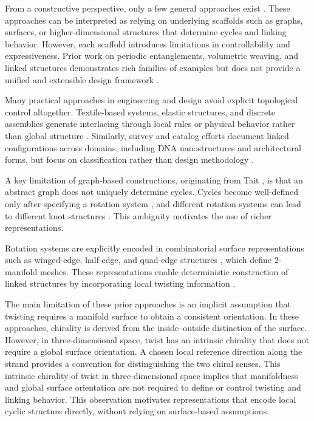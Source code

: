 \documentclass[acmtog]{acmart}
\begin{document}
From a constructive perspective, only a few general approaches exist \citep{tait1877knots,akleman2015extended,akleman2020topologically,akleman2015blockmeshes}. These approaches can be interpreted as relying on underlying scaffolds such as graphs, surfaces, or higher-dimensional structures that determine cycles and linking behavior. However, each scaffold introduces limitations in controllability and expressiveness. Prior work on periodic entanglements, volumetric weaving, and linked structures demonstrates rich families of examples but does not provide a unified and extensible design framework \citep{evans2013periodiceentanglement1,evans2013periodiceentanglement2,yildiz2025woven,yildiz2025linked}.

Many practical approaches in engineering and design avoid explicit topological control altogether. Textile-based systems, elastic structures, and discrete assemblies generate interlacing through local rules or physical behavior rather than global structure \citep{borhani2016material,borhani2016emergence,kozlov2013structures,liu2025doublelayeredegridshells,ren2021curvedribbons,verhoeff2011chainlinkfence,roelofs2007rings,yang2025topologicalwovennodes}. Similarly, survey and catalog efforts document linked configurations across domains, including DNA nanostructures and architectural forms, but focus on classification rather than design methodology \citep{glaser2021dnananostructures,kozlov2018knots,gailiunas2022tplinks}.

A key limitation of graph-based constructions, originating from Tait \citep{tait1877knots}, is that an abstract graph does not uniquely determine cycles. Cycles become well-defined only after specifying a rotation system \citep{edmonds1960combinatorial}, and different rotation systems can lead to different knot structures \citep{gross2001topological,akleman1999guaranteeing}. This ambiguity motivates the use of richer representations.

Rotation systems are explicitly encoded in combinatorial surface representations such as winged-edge, half-edge, and quad-edge structures \citep{baumgart1972,mantyla1988,guibas1985,akleman1999guaranteeing}, which define 2-manifold meshes. These representations enable deterministic construction of linked structures by incorporating local twisting information \citep{akleman2009cyclic,akleman2015extended,xing2010single,lipschutz2022linkedknots,sequin2021polyhedral}. 

The main limitation of these prior approaches is an implicit assumption that twisting requires a manifold surface to obtain a consistent orientation. In these approaches, chirality is derived from the inside–outside distinction of the surface. However, in three-dimensional space, twist has an intrinsic chirality that does not require a global surface orientation. A chosen local reference direction along the strand provides a convention for distinguishing the two chiral senses. This intrinsic chirality of twist in three-dimensional space implies that manifoldness and global surface orientation are not required to define or control twisting and linking behavior. This observation motivates representations that encode local cyclic structure directly, without relying on surface-based assumptions.
\end{document}
